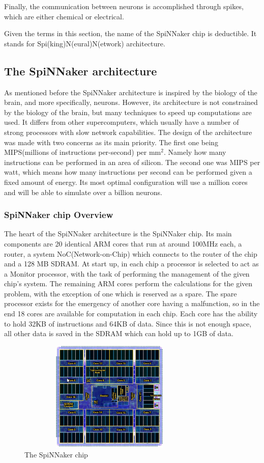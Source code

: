 \documentclass[12pt,a4paper]{article}
\begin{document}
Finally, the communication between neurons is accomplished through spikes, which are either chemical or electrical\cite{gerstner2002spiking}.

Given the terms in this section, the name of the SpiNNaker chip is deductible. It stands for Spi(king)N(eural)N(etwork) architecture.
\subsection{The SpiNNaker architecture}
As mentioned before the SpiNNaker architecture is inspired by the biology of the brain, and more specifically, neurons. However, its architecture is not constrained by the biology of the brain, but many techniques to speed up computations are used. It differs from other supercomputers, which  usually have a number of strong processors with slow network capabilities. The design of the architecture was made with two concerns as its main priority. The first one being MIPS(millions of instructions per-second) per mm$^2$. Namely how many instructions can be performed in an area of silicon. The second one was MIPS per watt, which means how many instructions per second can be performed given a fixed amount of energy. Its most optimal configuration will use a million cores and will be able to simulate over a billion neurons\cite{furber2007neural}.
\subsubsection {SpiNNaker chip Overview}
The heart of the SpiNNaker architecture is the SpiNNaker chip. Its main components are 20 identical ARM cores that run at around 100MHz each, a router, a system NoC(Network-on-Chip) which connects to the router of the chip and a 128 MB SDRAM. At start up, in each chip a processor is selected to act as a Monitor processor, with the task of performing the management of the given chip's system. The remaining ARM cores perform the calculations for the given problem, with the exception of one which is reserved as a spare. The spare processor exists for the emergency of another core having a malfunction, so in the end 18 cores are available for computation in each chip\cite{furber2007neural}. Each core has the ability to hold 32KB of instructions and 64KB of data. Since this is not enough space, all other data is saved in the SDRAM which can hold up to 1GB of data\cite{navaridas2009understanding}.
\begin{figure}[h!]
\includegraphics[width=250pt,height=150pt,scale=2]{Pics/chip.png}
\centering
\caption{The SpiNNaker chip\cite{spinnweb}}
\end{figure}
\end{document}
